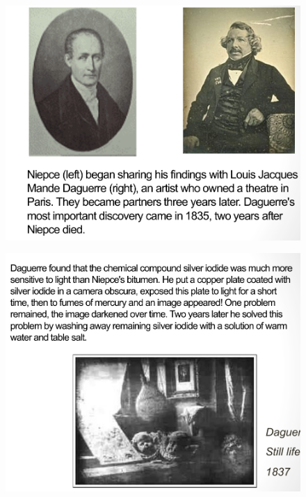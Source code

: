 \documentclass{beamer}
\begin{document}
\begin{frame}
	\begin{figure}
		\centering
		\includegraphics[scale=0.4]{77.jpg}
	\end{figure}
\end{frame}

\begin{frame}
	\begin{figure}
		\centering
		\includegraphics[scale=0.4]{78.jpg}
	\end{figure}
\end{frame}
\end{document}
